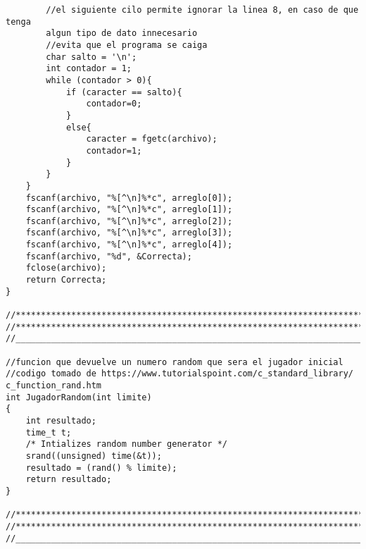 \begin{verbatim}
        //el siguiente cilo permite ignorar la linea 8, en caso de que tenga 
        algun tipo de dato innecesario
        //evita que el programa se caiga
        char salto = '\n';
        int contador = 1;
        while (contador > 0){
            if (caracter == salto){
                contador=0;
            }
            else{
                caracter = fgetc(archivo);
                contador=1;
            }
        }        
    }
    fscanf(archivo, "%[^\n]%*c", arreglo[0]);
    fscanf(archivo, "%[^\n]%*c", arreglo[1]);
    fscanf(archivo, "%[^\n]%*c", arreglo[2]);
    fscanf(archivo, "%[^\n]%*c", arreglo[3]);
    fscanf(archivo, "%[^\n]%*c", arreglo[4]);
    fscanf(archivo, "%d", &Correcta);
    fclose(archivo);
    return Correcta;
}

//*************************************************************************************
//*************************************************************************************
//_____________________________________________________________________________________

//funcion que devuelve un numero random que sera el jugador inicial
//codigo tomado de https://www.tutorialspoint.com/c_standard_library/
c_function_rand.htm
int JugadorRandom(int limite)
{
    int resultado; 
    time_t t;
    /* Intializes random number generator */
    srand((unsigned) time(&t));
    resultado = (rand() % limite);
    return resultado;
}

//*************************************************************************************
//*************************************************************************************
//_____________________________________________________________________________________


\end{verbatim}
